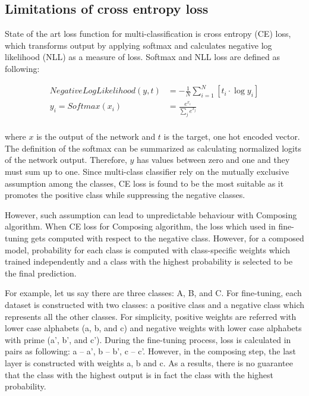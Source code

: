 \documentclass{article}
\begin{document}
\subsection{Limitations of cross entropy loss}

State of the art loss function for multi-classification is cross entropy (CE) loss, which transforms output by applying softmax and calculates negative log likelihood (NLL) as a measure of loss. Softmax and NLL loss are defined as following:

\begin{align*}
NegativeLogLikelihood(y, t) & = -\frac{1}{N}\sum_{i=1}^N \left[ t_i \cdot \log y_i\right] \\
y_i = Softmax(x_i) &= \frac{e^{x_i}}{\sum_{j}e^{x_j}} \\
\end{align*}

where $x$ is the output of the network and $t$ is the target, one hot encoded vector. The definition of the softmax can be summarized as calculating normalized logits of the network output. Therefore, $y$ has values between zero and one and they must sum up to one. Since multi-class classifier rely on the mutually exclusive assumption among the classes, CE loss is found to be the most suitable as it promotes the positive class while suppressing the negative classes.

However, such assumption can lead to unpredictable behaviour with Composing algorithm. When CE loss for Composing algorithm, the loss which used in fine-tuning gets computed with respect to the negative class. However, for a composed model, probability for each class is computed with class-specific weights which trained independently and a class with the highest probability is selected to be the final prediction.

For example, let us say there are three classes: A, B, and C. For fine-tuning, each dataset is constructed with two classes: a positive class and a negative class which represents all the other classes. For simplicity, positive weights are referred with lower case alphabets (a, b, and c) and negative weights with lower case alphabets with prime (a', b', and c'). During the fine-tuning process, loss is calculated in pairs as following: a -- a', b -- b', c -- c'. However, in the composing step, the last layer is constructed with weights a, b and c. As a results, there is no guarantee that the class with the highest output is in fact the class with the highest probability.
\end{document}
